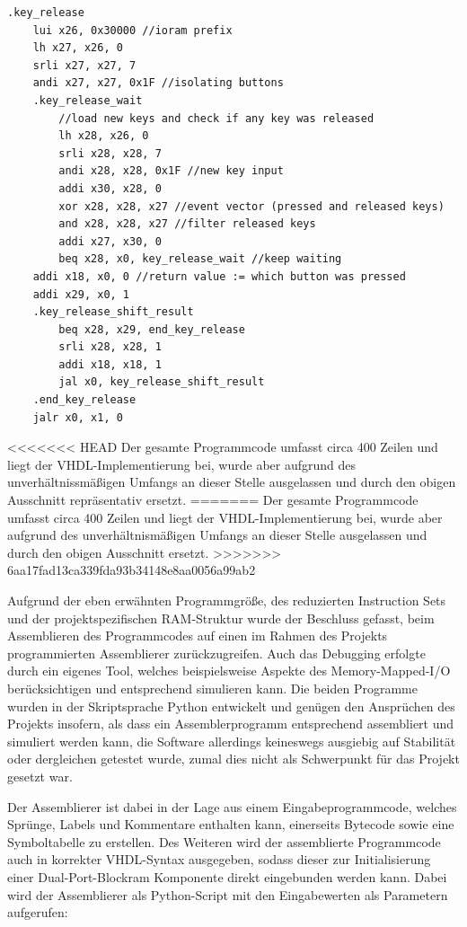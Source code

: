 \begin{lstlisting}
.key_release
	lui x26, 0x30000 //ioram prefix
	lh x27, x26, 0
	srli x27, x27, 7
	andi x27, x27, 0x1F //isolating buttons
	.key_release_wait
		//load new keys and check if any key was released
		lh x28, x26, 0
		srli x28, x28, 7
		andi x28, x28, 0x1F //new key input
		addi x30, x28, 0
		xor x28, x28, x27 //event vector (pressed and released keys)
		and x28, x28, x27 //filter released keys
		addi x27, x30, 0
		beq x28, x0, key_release_wait //keep waiting
	addi x18, x0, 0 //return value := which button was pressed
	addi x29, x0, 1
	.key_release_shift_result
		beq x28, x29, end_key_release
		srli x28, x28, 1
		addi x18, x18, 1
		jal x0, key_release_shift_result
	.end_key_release
	jalr x0, x1, 0
\end{lstlisting}

<<<<<<< HEAD
Der gesamte Programmcode umfasst circa 400 Zeilen und liegt der VHDL-Implementierung bei, wurde aber aufgrund des unverh\"altnissm\"a\ss{}igen Umfangs an dieser Stelle ausgelassen und durch den obigen Ausschnitt repr\"asentativ ersetzt.
=======
Der gesamte Programmcode umfasst circa 400 Zeilen und liegt der VHDL-Implementierung bei, wurde aber aufgrund des unverh\"altnism\"a\ss{}igen Umfangs an dieser Stelle ausgelassen und durch den obigen Ausschnitt ersetzt.
>>>>>>> 6aa17fad13ca339fda93b34148e8aa0056a99ab2


Aufgrund der eben erw\"ahnten Programmgr\"o\ss{}e, des reduzierten Instruction Sets und der projektspezifischen RAM-Struktur wurde der Beschluss gefasst, beim Assemblieren des Programmcodes auf einen im Rahmen des Projekts programmierten Assemblierer zur\"uckzugreifen. Auch das Debugging erfolgte durch ein eigenes Tool, welches beispielsweise Aspekte des Memory-Mapped-I/O ber\"ucksichtigen und entsprechend simulieren kann. Die beiden Programme wurden in der Skriptsprache Python entwickelt und gen\"ugen den Anspr\"uchen des Projekts insofern, als dass ein Assemblerprogramm entsprechend assembliert und simuliert werden kann, die Software allerdings keineswegs ausgiebig auf Stabilit\"at oder dergleichen getestet wurde, zumal dies nicht als Schwerpunkt f\"ur das Projekt gesetzt war.


Der Assemblierer ist dabei in der Lage aus einem Eingabeprogrammcode, welches Spr\"unge, Labels und Kommentare enthalten kann, einerseits Bytecode sowie eine Symboltabelle zu erstellen. Des Weiteren wird der assemblierte Programmcode auch in korrekter VHDL-Syntax ausgegeben, sodass dieser zur Initialisierung einer Dual-Port-Blockram Komponente direkt eingebunden werden kann. Dabei wird der Assemblierer als Python-Script mit den Eingabewerten als Parametern aufgerufen:

